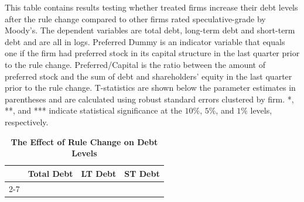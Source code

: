 \documentclass[a4paper, 12pt]{article}
\begin{document}
\begin{table}[htbp]
\caption{\textbf{The Effect of Rule Change on Debt Levels}} \label{table_debt_all}
\begin{singlespace}
\begin{small}

\noindent This table contains results testing whether treated firms increase their debt levels after the rule change compared to other firms rated speculative-grade by Moody's. The dependent variables are total debt, long-term debt and short-term debt and are all in logs. Preferred Dummy is an indicator variable that equals one if the firm had preferred stock in its capital structure in the last quarter prior to the rule change. Preferred/Capital is the ratio between the amount of preferred stock and the sum of debt and shareholders' equity in the last quarter prior to the rule change.  T-statistics are shown below the parameter estimates in parentheses and are calculated using robust standard errors clustered by firm. *, **, and *** indicate statistical significance at the $10\%$, $5\%$, and $1\%$ levels, respectively.

\end{small}
\end{singlespace}
\vspace{3mm}
\small
  \centering
    \begin{tabular}{lcccccc}
    \toprule
    \textbf{} &
      \multicolumn{2}{c}{\textbf{Total Debt}} &  \multicolumn{2}{c}{\textbf{LT Debt}} &
      \multicolumn{2}{c}{\textbf{ST Debt}}
      \\
      \cline{2-7}




    \bottomrule
    \end{tabular}
\end{table}
\clearpage

\newpage
\end{document}
